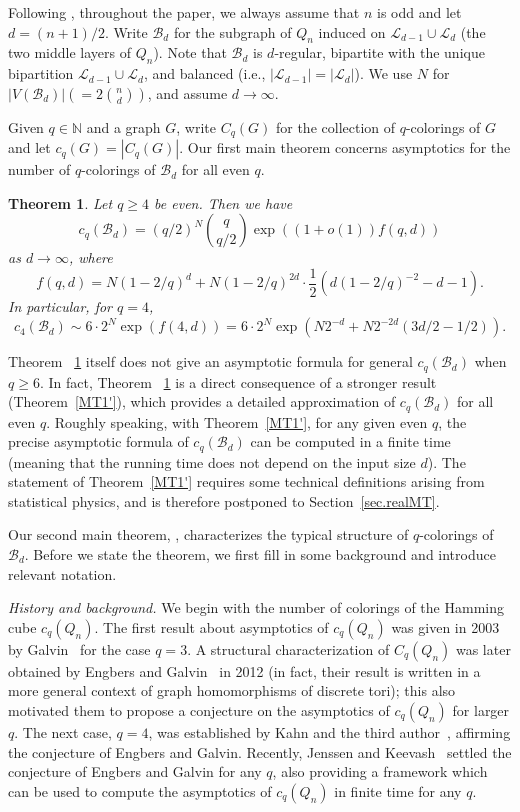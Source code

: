 \documentclass{amsart}
\newtheorem{thm}{Theorem}[section]
\theoremstyle{definition}
\newcommand{\cB}{\mathcal{B} }
\newcommand{\cL}{\mathcal{L} }
\newcommand{\0}[0]{\emptyset}
\newcommand{\ra}[0]{\rightarrow}
\begin{document}
Following \cite{BGL}, throughout the paper, we always assume that $n$ is odd and let $d=(n+1)/2$. Write $\cB_d$ for the subgraph of $Q_n$ induced on $\cL_{d-1} \cup \cL_d$ (the two middle layers of $Q_n$). Note that $\cB_d$ is $d$-regular, bipartite with the unique bipartition $\cL_{d-1} \cup \cL_d$, and balanced (i.e., $|\cL_{d-1}|=|\cL_d|$). We use $N$ for $|V(\cB_d)| (=2{n \choose d})$, and assume $d \ra \infty$.

Given $q \in \mathbb N$ and a graph $G$, write $C_q(G)$ for the collection of $q$-colorings of $G$ and let $c_q(G)=|C_q(G)|$. Our first main theorem concerns asymptotics for the number of $q$-colorings of $\cB_d$ for all even $q$. 

\begin{thm}\label{realMT}
Let $q \ge 4$ be even. Then we have 
\[
c_q(\cB_d)  = (q/2)^{N}\binom{q}{q/2}\exp\left((1+o(1))f(q, d)\right)
\]
as $d \ra \infty$, where
\[
f(q, d)= N(1 - 2/q)^d + N(1 - 2/q)^{2d}\cdot \frac{1}{2}\left(d(1 - 2/q)^{-2} - d-1\right).
\]
In particular, for $q=4$, 
\[
c_4(\cB_d)  \sim 6\cdot 2^N\exp\left(f(4, d)\right)=6\cdot 2^N\exp\left(N2^{-d} + N2^{-2d}(3d/2 -1/2)\right).
\]
\end{thm}
Theorem ~\ref{realMT} itself does not give an asymptotic formula for general $c_q(\cB_d)$ when $q\ge 6$.
In fact, Theorem ~\ref{realMT} is a direct consequence of a stronger result (Theorem~\ref{MT1'}), which provides a detailed approximation of $c_q(\cB_d)$ for all even $q$.
Roughly speaking, with Theorem~\ref{MT1'}, for any given even $q$, the precise asymptotic formula of $c_q(\cB_d)$ can be computed in a finite time (meaning that the running time does not depend on the input size $d$).
The statement of Theorem~\ref{MT1'} requires some technical definitions arising from {statistical physics}, and is therefore postponed to Section~\ref{sec.realMT}.

Our second main theorem, , characterizes the typical structure of $q$-colorings of $\cB_d$. Before we state the theorem, we first fill in some background and introduce relevant notation.
\vspace{5pt}

\noindent \textit{History and background.} 
We begin with the number of colorings of the Hamming cube $c_q(Q_n)$. The first result about asymptotics of $c_q(Q_n)$ was given in 2003 by Galvin~\cite{G} for the case $q=3$. 
A structural characterization of $C_q(Q_n)$ was later obtained by Engbers and Galvin~\cite{EG} in 2012 (in fact, their result is written in a more general context of graph homomorphisms of discrete tori); this also motivated them to propose a conjecture on the asymptotics of $c_q(Q_n)$ for larger $q$. The next case, $q=4$, was established by Kahn and the third author~\cite{KPq}, affirming the conjecture of Engbers and Galvin.
Recently, Jenssen and Keevash~\cite{JK} settled the conjecture of Engbers and Galvin for any $q$, also providing  a framework which can be used to compute the asymptotics of $c_q(Q_n)$ in finite time for any $q$.
\end{document}
